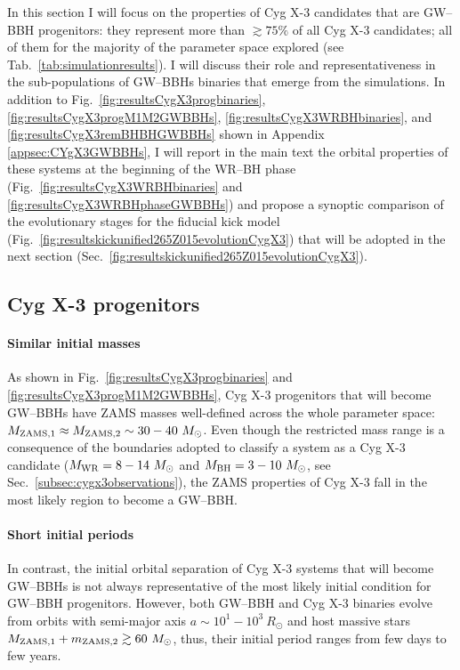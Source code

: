 \documentclass[a4paper,titlepage]{book}     	%
\newcommand{\sun}{\ensuremath{_\odot}}
\newcommand{\msun}{\ensuremath{M\sun}}
\newcommand{\rsun}{R_{\odot}}
\begin{document}
In this section I will focus on the properties of Cyg X-3 candidates that are GW--BBH progenitors: they represent more than $\gtrsim 75\%$ of all Cyg X-3 candidates; all of them for the majority of the parameter space explored (see Tab.\ \ref{tab:simulationresults}). I will discuss their role and representativeness in the sub-populations of GW--BBHs binaries that emerge from the simulations. In addition to Fig.\ \ref{fig:resultsCygX3progbinaries}, \ref{fig:resultsCygX3progM1M2GWBBHs}, \ref{fig:resultsCygX3WRBHbinaries}, and \ref{fig:resultsCygX3remBHBHGWBBHs} shown in Appendix \ref{appsec:CYgX3GWBBHs}, I will report in the main text the orbital properties of these systems at the beginning of the WR--BH phase (Fig.\ \ref{fig:resultsCygX3WRBHbinaries} and \ref{fig:resultsCygX3WRBHphaseGWBBHs}) and propose a synoptic comparison of the evolutionary stages for the fiducial kick model (Fig.\ \ref{fig:resultskickunified265Z015evolutionCygX3}) that will be adopted in the next section (Sec.\ \ref{fig:resultskickunified265Z015evolutionCygX3}). 


\subsection{Cyg X-3 progenitors}\label{subsec:ProgenitorsCygX3vsGWBBHs}
\paragraph{Similar initial masses} As shown in Fig.\ \ref{fig:resultsCygX3progbinaries} and \ref{fig:resultsCygX3progM1M2GWBBHs}, Cyg X-3 progenitors that will become GW--BBHs have ZAMS masses well-defined across the whole parameter space: $M_{\rm ZAMS,1} \approx M_{\rm ZAMS,2} \sim 30-40~\msun$. Even though the restricted mass range is a consequence of the boundaries adopted to classify a system as a Cyg X-3 candidate ($M_{\rm WR} = 8-14~\msun$ and $M_{\rm BH}=3-10~\msun$, see Sec.\ \ref{subsec:cygx3observations}), the ZAMS properties of Cyg X-3 fall in the most likely region to become a GW--BBH.

\paragraph{Short initial periods} In contrast, the initial orbital separation of Cyg X-3 systems that will become GW--BBHs is not always representative of the most likely initial condition for GW--BBH progenitors. However, both GW--BBH and Cyg X-3 binaries evolve from orbits with semi-major axis $a \sim 10^1-10^3~\rsun$ and host massive stars $M_{\rm ZAMS,1} + m_{\rm ZAMS,2} \gtrsim 60~\msun$, thus, their initial period ranges from few days to few years.
\end{document}
